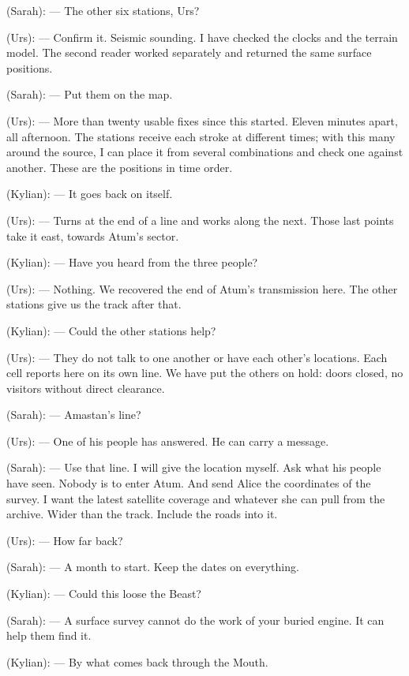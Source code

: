 
\begin{room}

(Sarah): --- The other six stations, Urs?

(Urs): --- Confirm it. Seismic sounding. I have checked the clocks and the terrain model. The second reader worked separately and returned the same surface positions.

(Sarah): --- Put them on the map.

(Urs): --- More than twenty usable fixes since this started. Eleven minutes apart, all afternoon. The stations receive each stroke at different times; with this many around the source, I can place it from several combinations and check one against another. These are the positions in time order.

(Kylian): --- It goes back on itself.

(Urs): --- Turns at the end of a line and works along the next. Those last points take it east, towards Atum's sector.

(Kylian): --- Have you heard from the three people?

(Urs): --- Nothing. We recovered the end of Atum's transmission here. The other stations give us the track after that.

(Kylian): --- Could the other stations help?

(Urs): --- They do not talk to one another or have each other's locations. Each cell reports here on its own line. We have put the others on hold: doors closed, no visitors without direct clearance.

(Sarah): --- Amastan's line?

(Urs): --- One of his people has answered. He can carry a message.

(Sarah): --- Use that line. I will give the location myself. Ask what his people have seen. Nobody is to enter Atum. And send Alice the coordinates of the survey. I want the latest satellite coverage and whatever she can pull from the archive. Wider than the track. Include the roads into it.

(Urs): --- How far back?

(Sarah): --- A month to start. Keep the dates on everything.

(Kylian): --- Could this loose the Beast?

(Sarah): --- A surface survey cannot do the work of your buried engine. It can help them find it.

(Kylian): --- By what comes back through the Mouth.


\end{room}
